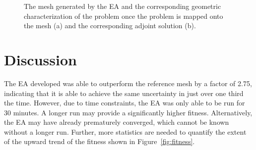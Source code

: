 \documentclass[conference]{IEEEtran}
\begin{document}
\begin{figure}[!t]
\centering
{}
\hfil
{}
\caption{The mesh generated by the EA and the corresponding geometric characterization of the problem once the problem is mapped onto the mesh (a) and the corresponding adjoint solution (b).}
\label{fig:optimal}
\end{figure}

\section{Discussion}
The EA developed was able to outperform the reference mesh by a factor of 2.75, indicating that it is able to achieve the same uncertainty in just over one third the time. However, due to time constraints, the EA was only able to be run for 30 minutes. A longer run may provide a significantly higher fitness. Alternatively, the EA may have already prematurely converged, which cannot be known without a longer run. Further, more statistics are needed to quantify the extent of the upward trend of the fitness shown in Figure~\ref{fig:fitness}.
\end{document}
